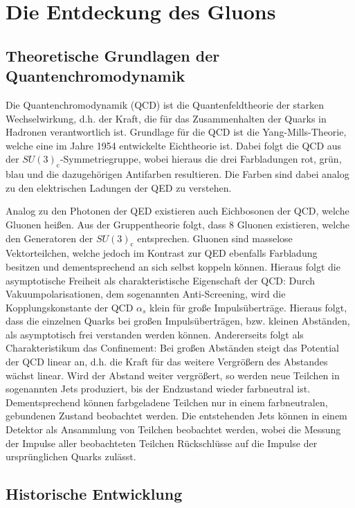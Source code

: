 
\section{Die Entdeckung des Gluons}


\subsection{Theoretische Grundlagen der Quantenchromodynamik}
Die Quantenchromodynamik (QCD) ist die Quantenfeldtheorie der starken Wechselwirkung, d.h. der Kraft, die für das Zusammenhalten der Quarks in Hadronen verantwortlich ist.
Grundlage für die QCD ist die Yang-Mills-Theorie, welche eine im Jahre 1954 entwickelte Eichtheorie ist.
Dabei folgt die QCD aus der $SU(3)_\text{c}$-Symmetriegruppe, wobei hieraus die drei Farbladungen rot, grün, blau und die dazugehörigen Antifarben resultieren.
Die Farben sind dabei analog zu den elektrischen Ladungen der QED zu verstehen.

Analog zu den Photonen der QED existieren auch Eichbosonen der QCD, welche Gluonen heißen.
Aus der Gruppentheorie folgt, dass 8 Gluonen existieren, welche den Generatoren der $SU(3)_\text{c}$ entsprechen.
Gluonen sind masselose Vektorteilchen, welche jedoch im Kontrast zur QED ebenfalls Farbladung besitzen und dementsprechend an sich selbst koppeln können.
Hieraus folgt die asymptotische Freiheit als charakteristische Eigenschaft der QCD:
Durch Vakuumpolarisationen, dem sogenannten Anti-Screening, wird die Kopplungskonstante der QCD $\alpha_{s}$ klein für große Impulsüberträge. 
Hieraus folgt, dass die einzelnen Quarks bei großen Impulsüberträgen, bzw. kleinen Abständen, als asymptotisch frei verstanden werden können.
Andererseits folgt als Charakteristikum das Confinement: Bei großen Abständen steigt das Potential der QCD linear an, d.h. die Kraft für das weitere Vergrößern des Abstandes wächst linear.
Wird der Abstand weiter vergrößert, so werden neue Teilchen in sogenannten Jets produziert, bis der Endzustand wieder farbneutral ist.
Dementsprechend können farbgeladene Teilchen nur in einem farbneutralen, gebundenen Zustand beobachtet werden.
Die entstehenden Jets können in einem Detektor als Ansammlung von Teilchen beobachtet werden, wobei die Messung der Impulse aller beobachteten Teilchen Rückschlüsse auf die Impulse der ursprünglichen Quarks zulässt.

\subsection{Historische Entwicklung}

